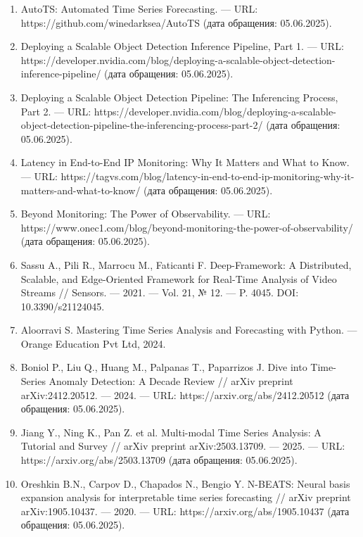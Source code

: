 \begin{enumerate}[label=\arabic*)\hspace{1em}, leftmargin=1cm, itemsep=0em]
	\item AutoTS: Automated Time Series Forecasting. — URL: https://github.com/winedarksea/AutoTS (дата обращения: 05.06.2025).
	\item Deploying a Scalable Object Detection Inference Pipeline, Part 1. — URL: https://developer.nvidia.com/blog/deploying-a-scalable-object-detection-inference-pipeline/ (дата обращения: 05.06.2025).
	\item Deploying a Scalable Object Detection Pipeline: The Inferencing Process, Part 2. — URL: https://developer.nvidia.com/blog/deploying-a-scalable-object-detection-pipeline-the-inferencing-process-part-2/ (дата обращения: 05.06.2025).
	\item Latency in End-to-End IP Monitoring: Why It Matters and What to Know. — URL: https://tagvs.com/blog/latency-in-end-to-end-ip-monitoring-why-it-matters-and-what-to-know/ (дата обращения: 05.06.2025).
	\item Beyond Monitoring: The Power of Observability. — URL: https://www.onec1.com/blog/beyond-monitoring-the-power-of-observability/ (дата обращения: 05.06.2025).
	\item Sassu A., Pili R., Marrocu M., Faticanti F. Deep-Framework: A Distributed, Scalable, and Edge-Oriented Framework for Real-Time Analysis of Video Streams // Sensors. — 2021. — Vol. 21, № 12. — P. 4045. DOI: 10.3390/s21124045.
	\item Aloorravi S. Mastering Time Series Analysis and Forecasting with Python. — Orange Education Pvt Ltd, 2024.
	\item Boniol P., Liu Q., Huang M., Palpanas T., Paparrizos J. Dive into Time-Series Anomaly Detection: A Decade Review // arXiv preprint arXiv:2412.20512. — 2024. — URL: https://arxiv.org/abs/2412.20512 (дата обращения: 05.06.2025).
	\item Jiang Y., Ning K., Pan Z. et al. Multi-modal Time Series Analysis: A Tutorial and Survey // arXiv preprint arXiv:2503.13709. — 2025. — URL: https://arxiv.org/abs/2503.13709 (дата обращения: 05.06.2025).
	\item Oreshkin B.N., Carpov D., Chapados N., Bengio Y. N-BEATS: Neural basis expansion analysis for interpretable time series forecasting // arXiv preprint arXiv:1905.10437. — 2020. — URL: https://arxiv.org/abs/1905.10437 (дата обращения: 05.06.2025).
\end{enumerate}